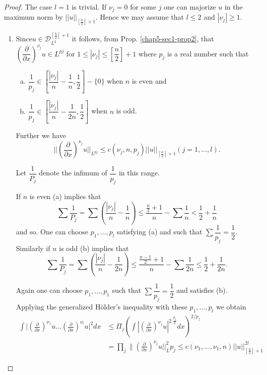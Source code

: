 \begin{proof}
The case $l=1$ is trivial. If $\nu_j = 0$ for some $j$ one can
majorize $u$ in the maximum norm by $|| u
||_{\left[\frac{n}{2} \right]+1}$. Hence we may assume that $l \leq
2$ and $|\nu_j|\geq 1$. 
\begin{enumerate}[\rm(i)]
\item Since\pageoriginale $u \in
\mathscr{D}^{\left[\frac{n}{2} \right]+1}_{L^2}$ it follows, from
Prop. \ref{chap5-sec1-prop2}, that  
$\left(\dfrac{\partial}{\partial x}\right)^{\nu_j}u \in L^{pj}$ for $1
\leq | \nu_j | \leq \left[\dfrac{n}{2} \right]+1$ where $p_j$ is a
real number such that 
\begin{enumerate}[(a)]
\item $\dfrac{1}{p_j} \in \left[\dfrac{|\nu_j|}{n}-
  \dfrac{1}{n}, \dfrac{1}{2}\right] - \{0\}$ when $n$ is even and  

\item $\dfrac{1}{p_j} \in \left[\dfrac{|\nu_j|}{n}-
  \dfrac{1}{2n}, \dfrac{1}{2}\right] $ when $n$ is odd. 
\end{enumerate}

Further we have
$$
|| \left(\frac{\partial}{\partial x}\right)^{\nu_j} u ||_{L^{pj}} \leq
c (\nu_j, n, p_j) || u ||_{\left[\frac{n}{2} \right]+1} (j = 1, \ldots, l). 
$$

Let $\dfrac{1}{P_j}$ denote the infimum of $\dfrac{1}{p_j}$ in this
range. 

If $n$ is even (a) implies that 
$$
\sum \frac{1}{P_j} = \sum \left( \frac{| \nu_j|}{n} -
\frac{1}{n}\right) \leq  \frac{\frac{n}{2}+1}{n} - \sum \frac{1}{n} <
\frac{1}{2} + \frac{1}{n}  
$$
and so. One can choose $p_1,
\ldots, p_l$ satisfying (a) and such that $\sum \dfrac{1}{p_j}=
\dfrac{1}{2}$. Similarly if $n$ is odd (b) implies that 
$$
\sum \frac{1}{P_j}= \sum \left(\frac{|\nu_j|}{n}- \frac{1}{2n}\right)
\leq \frac{\frac{n-1}{2}+1}{n} - \sum \frac{1}{2n} \leq \frac{1}{2}+ 
\frac{1}{2n}. 
$$

Again one can choose $p_1, \ldots, p_1$ such that $\sum
\dfrac{1}{p_j}= \dfrac{1}{2}$ and satisfies (b). Applying the
generalized H\"older's inequality with these $p_1, \ldots, p_l$ we
obtain 
{\fontsize{9pt}{11pt}\selectfont
\begin{align*}
\int | \left(\frac{\partial}{\partial x}\right)^{\nu_1}u \ldots
\left(\frac{\partial}{\partial x}\right)^{\nu_l}u \Big|^2 dx & \leq
\Pi_j \left(\int | 
\left(\frac{\partial}{\partial x}\right)^{\nu_j}u |^{2. \frac{p_j}{2}}
dx\right)^{2/p_j} \\ 
& = \prod\limits_j \|\left(\frac{\partial}{\partial x}\right)^{\nu_j}u ||^2_L p_j
\leq c(\nu_1, \ldots, \nu_1, n) || u ||^{2l}_{\left[\frac{n}{2}
    \right]+1}  
\end{align*}}\relax


\end{enumerate}
\end{proof}
